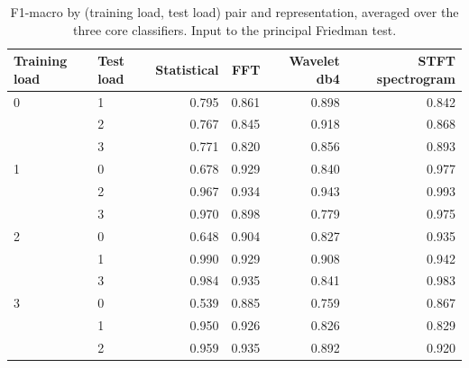 \begin{table}[htbp]
\centering
\caption{F1-macro by (training load, test load) pair and representation, averaged over the three core classifiers. Input to the principal Friedman test.}
\label{tab:friedman-bloques}
\begin{tabular}{llrrrr}
\toprule
Training load & Test load & Statistical & FFT & Wavelet db4 & STFT spectrogram \\
\midrule
0 & 1 & 0.795 & 0.861 & 0.898 & 0.842 \\
 & 2 & 0.767 & 0.845 & 0.918 & 0.868 \\
 & 3 & 0.771 & 0.820 & 0.856 & 0.893 \\
1 & 0 & 0.678 & 0.929 & 0.840 & 0.977 \\
 & 2 & 0.967 & 0.934 & 0.943 & 0.993 \\
 & 3 & 0.970 & 0.898 & 0.779 & 0.975 \\
2 & 0 & 0.648 & 0.904 & 0.827 & 0.935 \\
 & 1 & 0.990 & 0.929 & 0.908 & 0.942 \\
 & 3 & 0.984 & 0.935 & 0.841 & 0.983 \\
3 & 0 & 0.539 & 0.885 & 0.759 & 0.867 \\
 & 1 & 0.950 & 0.926 & 0.826 & 0.829 \\
 & 2 & 0.959 & 0.935 & 0.892 & 0.920 \\
\bottomrule
\end{tabular}
\end{table}
